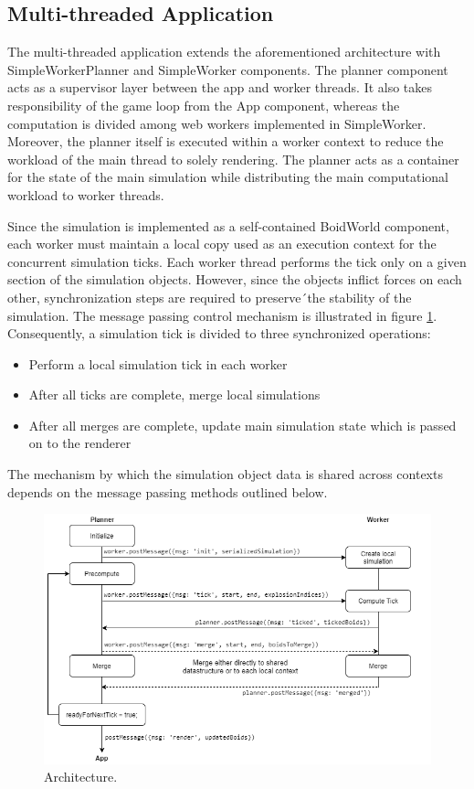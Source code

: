 \documentclass[conference]{IEEEtran}
\begin{document}
\subsection{Multi-threaded Application}
The multi-threaded application extends the aforementioned architecture with SimpleWorkerPlanner and SimpleWorker components. The planner component acts as a supervisor layer between the app and worker threads. It also takes responsibility of the game loop from the App component, whereas the computation is divided among web workers implemented in SimpleWorker. Moreover, the planner itself is executed within a worker context to reduce the workload of the main thread to solely rendering. The planner acts as a container for the state of the main simulation while distributing the main computational workload to worker threads.

Since the simulation is implemented as a self-contained BoidWorld component, each worker must maintain a local copy used as an execution context for the concurrent simulation ticks. Each worker thread performs the tick only on a given section of the simulation objects. However, since the objects inflict forces on each other, synchronization steps are required to preserve´the stability of the simulation. The message passing control mechanism is illustrated in figure \ref{fig:message_architecture}. Consequently, a simulation tick is divided to three synchronized operations:

\begin{itemize}
  \item Perform a local simulation tick in each worker
  \item After all ticks are complete, merge local simulations
  \item After all merges are complete, update main simulation state which is passed on to the renderer
\end{itemize}

The mechanism by which the simulation object data is shared across contexts depends on the message passing methods outlined below.

\begin{figure}[ht]
	\centering
	\includegraphics[scale=0.3]{figs/message_architecture.png}
	\caption{Architecture.}
	\label{fig:message_architecture}
\end{figure}
\end{document}

